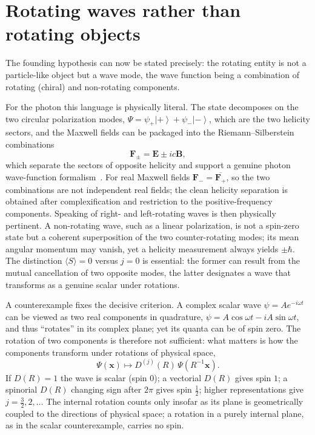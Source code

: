 \documentclass[11pt,a4paper]{article}
\newcommand{\ket}[1]{\left|#1\right\rangle}
\begin{document}
\section{Rotating waves rather than rotating objects}
\label{sec:rotatingwaves}

The founding hypothesis can now be stated precisely: the rotating entity is not a particle-like object but
a wave mode, the wave function being a combination of rotating (chiral) and non-rotating components.

For the photon this language is physically literal.
The state decomposes on the two circular polarization modes,
$\Psi = \psi_+ \ket{+} + \psi_- \ket{-}$, which are the two helicity sectors, and the Maxwell fields can be
packaged into the Riemann--Silberstein combinations
\begin{equation}
\mathbf{F}_\pm = \mathbf{E} \pm i c \mathbf{B},
\label{eq:riemannsilberstein}
\end{equation}
which separate the sectors of opposite helicity and support a genuine photon wave-function
formalism~\cite{BialynickiBirula1996}.
For real Maxwell fields $\mathbf{F}_- = \overline{\mathbf{F}_+}$, so the two combinations are not
independent real fields; the clean helicity separation is obtained after complexification and restriction
to the positive-frequency components.
Speaking of right- and left-rotating waves is then physically pertinent.
A non-rotating wave, such as a linear polarization, is not a spin-zero state but a coherent superposition of
the two counter-rotating modes; its mean angular momentum may vanish, yet a helicity measurement always
yields $\pm\hbar$.
The distinction $\langle S \rangle = 0$ versus $j = 0$ is essential: the former can result from the mutual
cancellation of two opposite modes, the latter designates a wave that transforms as a genuine scalar under
rotations.

A counterexample fixes the decisive criterion.
A complex scalar wave $\psi = A e^{-i\omega t}$ can be viewed as two real components in quadrature,
$\psi = A\cos\omega t - iA\sin\omega t$, and thus ``rotates'' in its complex plane; yet its quanta can be of
spin zero.
The rotation of two components is therefore not sufficient: what matters is how the components transform
under rotations of physical space,
\begin{equation}
\Psi(\mathbf{x}) \longmapsto D^{(j)}(R)\, \Psi(R^{-1}\mathbf{x}).
\label{eq:transformationlaw}
\end{equation}
If $D(R) = 1$ the wave is scalar (spin $0$); a vectorial $D(R)$ gives spin $1$; a spinorial $D(R)$ changing
sign after $2\pi$ gives spin $\tfrac12$; higher representations give $j = \tfrac32, 2, \ldots$
The internal rotation counts only insofar as its plane is geometrically coupled to the directions of
physical space; a rotation in a purely internal plane, as in the scalar counterexample, carries no spin.
\end{document}

